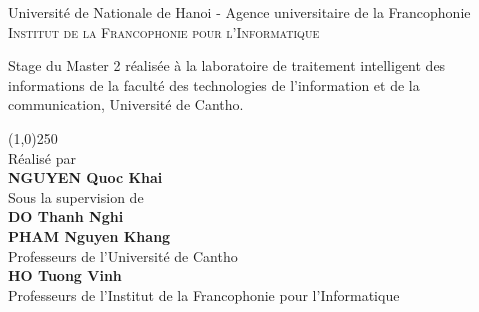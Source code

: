 \newpage
\thispagestyle{empty}

\begin{center}

\huge{Université de Nationale de Hanoi - Agence universitaire de la Francophonie}\\[0.5cm]
\normalsize
\textsc{Institut de la Francophonie pour l'Informatique}\\[2.0cm]
\end{center}

\normalsize Stage du Master 2 réalisée à la laboratoire de traitement intelligent des informations de la faculté des technologies de l'information et de la communication, Université de Cantho.\\[1.0cm]


\begin{flushright}
\line(1,0){250} \\
Réalisé par \\
\textbf{NGUYEN Quoc Khai}\\[1.5cm]

Sous la supervision de \\
{\textbf{DO Thanh Nghi}}\\
{\textbf{PHAM Nguyen Khang}}\\
Professeurs de l'Université de Cantho \\[0.5cm]

{\textbf{HO Tuong Vinh}}\\
Professeurs de l'Institut de la Francophonie pour l'Informatique

\end{flushright}



